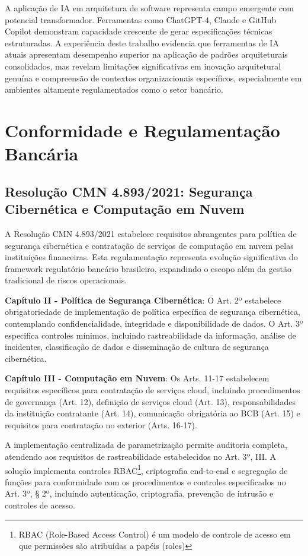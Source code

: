A aplicação de IA em arquitetura de software representa campo emergente com potencial transformador. Ferramentas como ChatGPT-4, Claude e GitHub Copilot demonstram capacidade crescente de gerar especificações técnicas estruturadas. A experiência deste trabalho evidencia que ferramentas de IA atuais apresentam desempenho superior na aplicação de padrões arquiteturais consolidados, mas revelam limitações significativas em inovação arquitetural genuína e compreensão de contextos organizacionais específicos, especialmente em ambientes altamente regulamentados como o setor bancário.

\section{Conformidade e Regulamentação Bancária}

\subsection{Resolução CMN 4.893/2021: Segurança Cibernética e Computação em Nuvem}


A Resolução CMN 4.893/2021 estabelece requisitos abrangentes para política de segurança cibernética e contratação de serviços de computação em nuvem pelas instituições financeiras. Esta regulamentação representa evolução significativa do framework regulatório bancário brasileiro, expandindo o escopo além da gestão tradicional de riscos operacionais.

\textbf{Capítulo II - Política de Segurança Cibernética}: O Art. 2º estabelece obrigatoriedade de implementação de política específica de segurança cibernética, contemplando confidencialidade, integridade e disponibilidade de dados. O Art. 3º especifica controles mínimos, incluindo rastreabilidade da informação, análise de incidentes, classificação de dados e disseminação de cultura de segurança cibernética.

\textbf{Capítulo III - Computação em Nuvem}: Os Arts. 11-17 estabelecem requisitos específicos para contratação de serviços cloud, incluindo procedimentos de governança (Art. 12), definição de serviços cloud (Art. 13), responsabilidades da instituição contratante (Art. 14), comunicação obrigatória ao BCB (Art. 15) e requisitos para contratação no exterior (Arts. 16-17).

A implementação centralizada de parametrização permite auditoria completa, atendendo aos requisitos de rastreabilidade estabelecidos no Art. 3º, III. A solução implementa controles RBAC\footnote{RBAC (Role-Based Access Control) é um modelo de controle de acesso em que permissões são atribuídas a papéis (roles)}, criptografia end-to-end e segregação de funções para conformidade com os procedimentos e controles especificados no Art. 3º, § 2º, incluindo autenticação, criptografia, prevenção de intrusão e controles de acesso.


